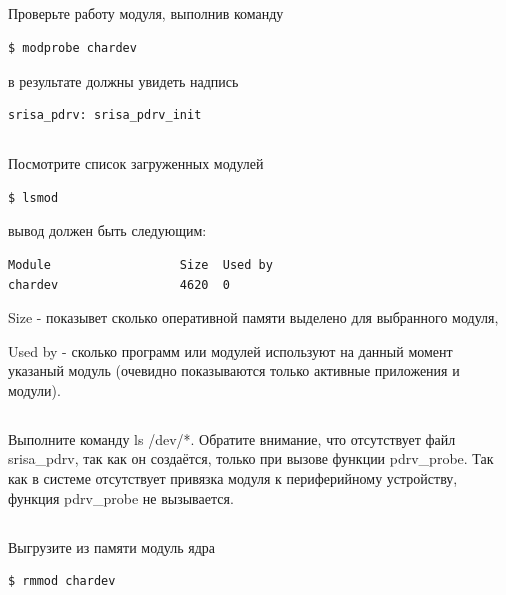 \subsection{} Проверьте работу модуля, выполнив команду
\begin{lstlisting}[style=bash]
$ modprobe chardev
\end{lstlisting}
в результате должны увидеть надпись 
\begin{lstlisting}[style=stdout]
srisa_pdrv: srisa_pdrv_init
\end{lstlisting}

\subsection{} Посмотрите список загруженных модулей
\begin{lstlisting}[style=bash]
$ lsmod
\end{lstlisting}
вывод должен быть следующим:
\begin{lstlisting}[style=stdout]
Module                  Size  Used by
chardev                 4620  0
\end{lstlisting}

Size - показывет сколько оперативной памяти выделено для выбранного модуля,

Used by - сколько программ или модулей используют на данный момент указаный модуль (очевидно показываются только активные приложения и модули). 

\subsection{} Выполните команду ls /dev/*. Обратите внимание, что отсутствует файл srisa\_pdrv, так как он создаётся, только при вызове функции pdrv\_probe. Так как в системе отсутствует привязка модуля к периферийному устройству, функция pdrv\_probe не вызывается.

\subsection{}Выгрузите из памяти модуль ядра
\begin{lstlisting}[style=bash]
$ rmmod chardev
\end{lstlisting}

